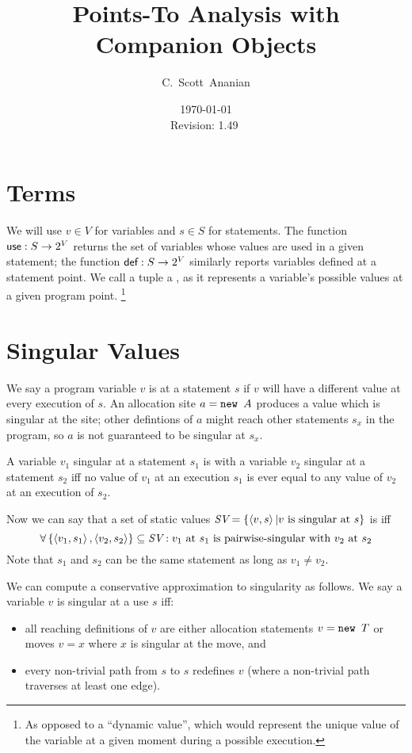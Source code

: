 \documentclass[11pt,notitlepage]{article}
\author{C.~Scott~Ananian}
\title{Points-To Analysis with Companion Objects}
\date{\today \\ $ $Revision: 1.49 $ $}
\newcommand{\bigvar}[1]{\ensuremath{\text{\it #1}}}
\newcommand{\func}[1]{\ensuremath{\text{\sffamily #1}}}
\begin{document}

\maketitle
\section{Terms} %
We will use $v\in V$ for variables and $s\in S$ for statements.  The
function $\func{use}:S\to 2^V$ returns the set of variables whose
values are used in a given statement; the function $\func{def}:S\to
2^V$ similarly reports variables defined at a statement point.
We call a tuple  a , as it represents
a variable's possible values at a given program point.%
\footnote{As opposed to a ``dynamic value'', which would represent the
  unique value of the variable at a given moment during a possible execution.}

\section{Singular Values}

We say a program variable $v$ is  at a statement $s$
if $v$ will have a different value at every execution of $s$.  An
allocation site $a = \text{\tt new }A$ produces a value which is singular
at the site; other defintions of $a$ might reach other statements
$s_x$ in the program, so $a$ is not guaranteed to be singular at $s_x$.

A variable $v_1$ singular at a statement $s_1$ is
 with a variable $v_2$ singular at a statement
$s_2$ iff no value of $v_1$ at an execution $s_1$ is ever equal to any
value of $v_2$ at an execution of $s_2$.

Now we can say that a set of static values
$\bigvar{SV}=\left\{ \tuple{v,s} | v \text{ is singular at } s \right\}$
is
 iff
\begin{displaymath}
\forall \left\{ \tuple{v_1,s_1}, \tuple{v_2,s_2} \right\} \subseteq
        \bigvar{SV} :
v_1 \text{ at } s_1 \text{ is pairwise-singular with } v_2 \text{ at } s_2
\end{displaymath}
Note that $s_1$ and $s_2$ can be the same statement as long as $v_1\neq v_2$.

We can compute a conservative approximation to singularity as follows.
We say a variable $v$ is singular at a use $s$ iff:
\begin{itemize}
\item all reaching definitions of $v$ are either allocation statements 
$v = \text{\tt new }T$ or moves $v = x$ where $x$ is singular at
the move, and
\item every non-trivial path from $s$ to $s$ redefines $v$ (where a
  non-trivial path traverses at least one edge).
\end{itemize}
\end{document}
